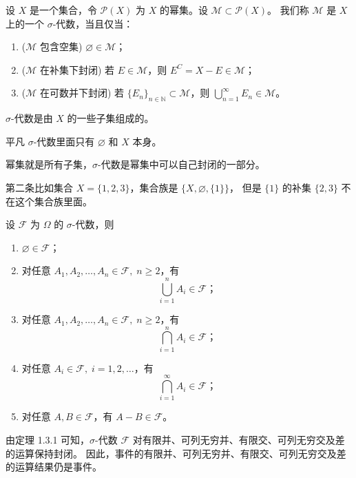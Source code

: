 \begin{definition}[ $\sigma$-代数]
设 $X$ 是一个集合，令 $\mathcal{P}(X)$ 为 $X$ 的幂集。设 $\mathcal{M} \subset \mathcal{P}(X)$。  
我们称 $\mathcal{M}$ 是 $X$ 上的一个 $\sigma$-代数，当且仅当：
\begin{enumerate}
  \item (\(\mathcal{M}\) 包含空集) \quad $\varnothing \in \mathcal{M}$；
  \item (\(\mathcal{M}\) 在补集下封闭) \quad 若 $E \in \mathcal{M}$，则 $E^C = X-E \in \mathcal{M}$；
  \item (\(\mathcal{M}\) 在可数并下封闭) \quad 若 $\{E_n\}_{n\in\mathbb{N}} \subset \mathcal{M}$，则 $\bigcup_{n=1}^\infty E_n \in \mathcal{M}$。
\end{enumerate}
\end{definition}
\begin{dxtips}[$\sigma$代数]
 $\sigma$-代数是由 $X$ 的一些子集组成的。  

平凡 $\sigma$-代数里面只有 $\varnothing$ 和 $X$ 本身。  

幂集就是所有子集，$\sigma$-代数是幂集中可以自己封闭的一部分。  

第二条比如集合 $X=\{1,2,3\}$，集合族是 $\{X,\varnothing,\{1\}\}$，  
但是 $\{1\}$ 的补集 $\{2,3\}$ 不在这个集合族里面。   
\end{dxtips}
\begin{theorem}
设 $\mathcal{F}$ 为 $\Omega$ 的 $\sigma$-代数，则
\begin{enumerate}
  \item $\varnothing \in \mathcal{F}$；
  \item 对任意 $A_1,A_2,\dots,A_n \in \mathcal{F},\; n \geq 2$，有 
  \[
  \bigcup_{i=1}^n A_i \in \mathcal{F}；
  \]
  \item 对任意 $A_1,A_2,\dots,A_n \in \mathcal{F},\; n \geq 2$，有 
  \[
  \bigcap_{i=1}^n A_i \in \mathcal{F}；
  \]
  \item 对任意 $A_i \in \mathcal{F},\; i=1,2,\dots$，有 
  \[
  \bigcap_{i=1}^\infty A_i \in \mathcal{F}；
  \]
  \item 对任意 $A,B \in \mathcal{F}$，有 $A-B \in \mathcal{F}$。
\end{enumerate}
\end{theorem}
由定理 1.3.1 可知，$\sigma$-代数 $\mathcal{F}$ 对有限并、可列无穷并、有限交、可列无穷交及差的运算保持封闭。  
因此，事件的有限并、可列无穷并、有限交、可列无穷交及差的运算结果仍是事件。
